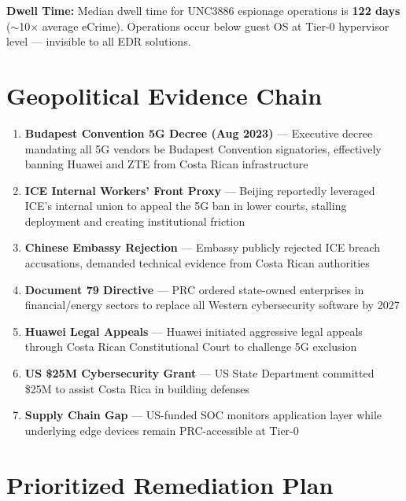 \documentclass[11pt,a4paper]{article}
\begin{document}
\vspace{0.5em}
\textbf{Dwell Time:} Median dwell time for UNC3886 espionage operations is \textbf{122 days} ($\sim$10$\times$ average eCrime). Operations occur below guest OS at Tier-0 hypervisor level — invisible to all EDR solutions.

\section{Geopolitical Evidence Chain}

\begin{enumerate}[label=\arabic*.]
  \item \textbf{Budapest Convention 5G Decree (Aug 2023)} — Executive decree mandating all 5G vendors be Budapest Convention signatories, effectively banning Huawei and ZTE from Costa Rican infrastructure
  \item \textbf{ICE Internal Workers' Front Proxy} — Beijing reportedly leveraged ICE's internal union to appeal the 5G ban in lower courts, stalling deployment and creating institutional friction
  \item \textbf{Chinese Embassy Rejection} — Embassy publicly rejected ICE breach accusations, demanded technical evidence from Costa Rican authorities
  \item \textbf{Document 79 Directive} — PRC ordered state-owned enterprises in financial/energy sectors to replace all Western cybersecurity software by 2027
  \item \textbf{Huawei Legal Appeals} — Huawei initiated aggressive legal appeals through Costa Rican Constitutional Court to challenge 5G exclusion
  \item \textbf{US \$25M Cybersecurity Grant} — US State Department committed \$25M to assist Costa Rica in building defenses
  \item \textbf{Supply Chain Gap} — US-funded SOC monitors application layer while underlying edge devices remain PRC-accessible at Tier-0
\end{enumerate}

\section{Prioritized Remediation Plan}
\end{document}
